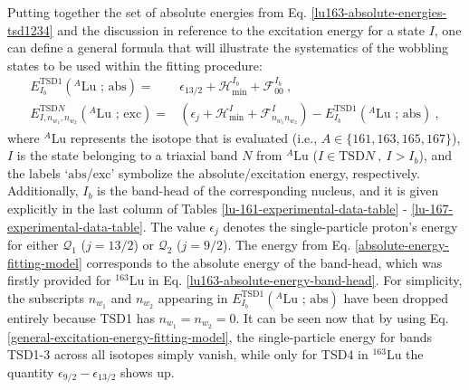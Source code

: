 Putting together the set of absolute energies from Eq. \ref{lu163-absolute-energies-tsd1234} and the discussion in reference to the excitation energy for a state $I$, one can define a general formula that will illustrate the systematics of the wobbling states to be used within the fitting procedure:
\begin{align}
    E_{I_b}^\text{TSD1}(^A\text{Lu\ ;\ abs})=&\epsilon_{13/2}+\mathcal{H}_\text{min}^{I_b}+\mathcal{F}_{00}^{I_b}\ ,\label{absolute-energy-fitting-model}\\
    E_{I,n_{w_1},n_{w_2}}^{\text{TSD}N}(^A\text{Lu\ ;\ exc})=&\left(\epsilon_j+\mathcal{H}_\text{min}^I+\mathcal{F}^I_{n_{w_1}n_{w_2}}\right)-E_{I_b}^\text{TSD1}(^A\text{Lu\ ;\ abs})\ ,
    \label{general-excitation-energy-fitting-model}
\end{align}
where $^A$Lu represents the isotope that is evaluated (i.e., $A\in\{161,163,165,167\}$), $I$ is the state belonging to a triaxial band $N$ from $^A$Lu ($I\in\text{TSD}N\ ,\ I>I_b$), and the labels `$\text{abs}$/$\text{exc}$' symbolize the absolute/excitation energy, respectively. Additionally, $I_b$ is the band-head of the corresponding nucleus, and it is given explicitly in the last column of Tables \ref{lu-161-experimental-data-table} - \ref{lu-167-experimental-data-table}. The value $\epsilon_j$ denotes the single-particle proton's energy for either $\mathcal{Q}_1$ ($j=13/2$) or $\mathcal{Q}_2$ ($j=9/2$). The energy from Eq. \ref{absolute-energy-fitting-model} corresponds to the absolute energy of the band-head, which was firstly provided for $^{163}$Lu in Eq. \ref{lu163-absolute-energy-band-head}. For simplicity, the subscripts $n_{w_1}$ and $n_{w_2}$ appearing in $E_{I_b}^\text{TSD1}(^A\text{Lu\ ;\ abs})$ have been dropped entirely because TSD1 has $n_{w_1}=n_{w_2}=0$. It can be seen now that by using Eq. \ref{general-excitation-energy-fitting-model}, the single-particle energy for bands TSD1-3 across all isotopes simply vanish, while only for TSD4 in $^{163}$Lu the quantity $\epsilon_{9/2}-\epsilon_{13/2}$ shows up.

